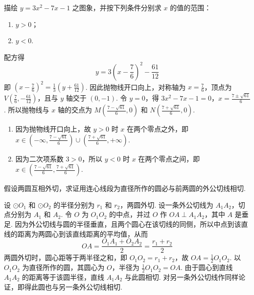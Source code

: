 \begin{problem}
描绘 \(y=3x^{2}-7x-1\) 之图象，并按下列条件分别求 \(x\) 的值的范围：

\begin{enumerate}
\item \(y>0\)；
\item \(y<0\).
\end{enumerate}
\end{problem}

\begin{solution}
配方得
\[
y=3\left(x-\frac{7}{6}\right)^{2}-\frac{61}{12}
\]
即 \(\left(x-\frac{7}{6}\right)^{2}=\frac{1}{3}\left(y+\frac{61}{12}\right)\). 因此抛物线开口向上，对称轴为 \(x=\frac{7}{6}\)，顶点为 \(V\left(\frac{7}{6},-\frac{61}{12}\right)\)，且与 \(y\) 轴交于 \((0,-1)\). 令 \(y=0\)，得
\(3x^{2}-7x-1=0\)，\(x=\frac{7\pm\sqrt{61}}{6}\).
所以抛物线与 \(x\) 轴的交点为 \(M\left(\frac{7-\sqrt{61}}{6},0\right)\) 和 \(N\left(\frac{7+\sqrt{61}}{6},0\right)\).

\begin{enumerate}
\item 因为抛物线开口向上，故 \(y>0\) 时 \(x\) 在两个零点之外，即 \(x\in\left(-\infty,\frac{7-\sqrt{61}}{6}\right)\cup\left(\frac{7+\sqrt{61}}{6},+\infty\right)\).

\item 因为二次项系数 \(3>0\)，所以 \(y<0\) 时 \(x\) 在两个零点之间，即 \(x\in\left(\frac{7-\sqrt{61}}{6},\frac{7+\sqrt{61}}{6}\right)\).
\end{enumerate}

\end{solution}

\begin{problem}
假设两圆互相外切，求证用连心线段为直径所作的圆必与前两圆的外公切线相切.
\end{problem}

\begin{solution}
设 \(\odot O_{1}\) 和 \(\odot O_{2}\) 的半径分别为 \(r_{1}\) 和 \(r_{2}\)，两圆外切. 设一条外公切线为 \(A_{1}A_{2}\)，切点分别为 \(A_{1}\) 和 \(A_{2}\). 令 \(O\) 为 \(O_{1}O_{2}\) 的中点，并过 \(O\) 作 \(OA\perp A_{1}A_{2}\)，其中 \(A\) 是垂足. 因为外公切线与圆的半径垂直，且两个圆心在该切线的同侧，所以中点到该直线的距离为两圆心到该直线距离的平均值，从而
\[
OA=\frac{O_{1}A_{1}+O_{2}A_{2}}{2}=\frac{r_{1}+r_{2}}{2}
\]
两圆外切时，圆心距等于两半径之和，即 \(O_{1}O_{2}=r_{1}+r_{2}\)，故 \(OA=\frac{1}{2}O_{1}O_{2}\). 以 \(O_{1}O_{2}\) 为直径所作的圆，其圆心为 \(O\)，半径为 \(\frac{1}{2}O_{1}O_{2}=OA\). 由于圆心到直线 \(A_{1}A_{2}\) 的距离等于该圆半径，直线 \(A_{1}A_{2}\) 与此圆相切. 对另一条外公切线作同样论证，即得此圆也与另一条外公切线相切.

\end{solution}


